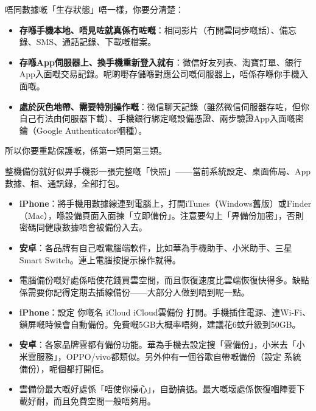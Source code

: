


唔同數據嘅「生存狀態」唔一樣，你要分清楚：

\begin{itemize}
  \item \textbf{存喺手機本地、唔見咗就真係冇咗嘅}：相同影片（冇開雲同步嘅話）、備忘錄、SMS、通話記錄、下載嘅檔案。
  \item \textbf{存喺App伺服器上、換手機重新登入就有}：微信好友列表、淘寶訂單、銀行App入面嘅交易記錄。呢啲嘢存儲喺對應公司嘅伺服器上，唔係存喺你手機入面嘅。
  \item \textbf{處於灰色地帶、需要特別操作嘅}：微信聊天記錄（雖然微信伺服器存咗，但你自己冇法由伺服器下載）、手機銀行綁定嘅設備憑證、兩步驗證App入面嘅密鑰（Google Authenticator嗰種）。
\end{itemize}

所以你要重點保護嘅，係第一類同第三類。


整機備份就好似畀手機影一張完整嘅「快照」——當前系統設定、桌面佈局、App數據、相、通訊錄，全部打包。


\begin{itemize}
  \item \textbf{iPhone}：將手機用數據線連到電腦上，打開iTunes（Windows舊版）或Finder（Mac），喺設備頁面入面揀「立即備份」。注意要勾上「畀備份加密」，否則密碼同健康數據唔會被備份入去。
  \item \textbf{安卓}：各品牌有自己嘅電腦端軟件，比如華為手機助手、小米助手、三星Smart Switch。連上電腦按提示操作就得。
  \item 電腦備份嘅好處係唔使花錢買雲空間，而且恢復速度比雲端恢復快得多。缺點係需要你記得定期去插線備份——大部分人做到唔到呢一點。
\end{itemize}


\begin{itemize}
  \item \textbf{iPhone}：設定 你嘅名 iCloud iCloud雲備份 打開。手機插住電源、連Wi-Fi、鎖屏嘅時候會自動備份。免費嘅5GB大概率唔夠，建議花6蚊升級到50GB。
  \item \textbf{安卓}：各家品牌雲都有備份功能。華為手機去設定搜「雲備份」，小米去「小米雲服務」，OPPO/vivo都類似。另外仲有一個谷歌自帶嘅備份（設定 系統 備份），呢個都打開佢。
  \item 雲備份最大嘅好處係「唔使你操心」，自動搞掂。最大嘅壞處係恢復嗰陣要下載好耐，而且免費空間一般唔夠用。
\end{itemize}

